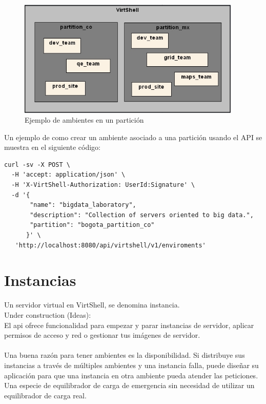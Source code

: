 \begin{figure}[h]
    \centering
	\caption{Ejemplo de ambientes en un partición}
	\label{fig:enviroment}
	\includegraphics[width = 0.95\textwidth]{../architecture/v1/diagrams/enviroments}
\end{figure}

Un ejemplo de como crear un ambiente asociado a una partición usando el API se muestra en el siguiente código:

\begin{lstlisting}[style=json, caption=Petición HTTP para crear un ambiente]
curl -sv -X POST \
  -H 'accept: application/json' \
  -H 'X-VirtShell-Authorization: UserId:Signature' \
  -d '{
       "name": "bigdata_laboratory",
       "description": "Collection of servers oriented to big data.", 
       "partition": "bogota_partition_co"
      }' \
   'http://localhost:8080/api/virtshell/v1/enviroments'
\end{lstlisting}

\section{Instancias}
Un servidor virtual en VirtShell, se denomina instancia.
\\
Under construction (Ideas): \\
El api ofrece funcionalidad para empezar y parar instancias de servidor, aplicar permisos de acceso y red o gestionar tus imágenes de servidor.\\
\\
Una buena razón para tener ambientes es la disponibilidad. Si distribuye sus instancias a través de múltiples ambientes y una instancia falla, puede diseñar su aplicación para que una instancia en otra ambiente pueda atender las peticiones. Una especie de equilibrador de carga de emergencia sin necesidad de utilizar un equilibrador de carga real.
